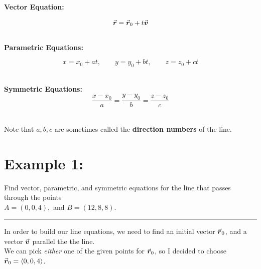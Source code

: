 \hspace*{.2in}





\textbf{Vector Equation:}

\[
\r = \r_0 + t \v
\]
~\\

\textbf{Parametric Equations:}

\[
x = x_0 + a t, \qquad y = y_0 + b t, \qquad z = z_0 + c t
\]

~\\

\textbf{Symmetric Equations:}\\

\[
\frac{x-x_0}{a} = \frac{ y - y_0}{b} = \frac{z - z_0}{c}
\]

~\\


Note that \(a, b, c\) are sometimes called the \textbf{direction numbers} of the line.



%

\section*{Example 1:}%

%
Find vector, parametric, and symmetric equations for the line that passes through the points\\ \(
A = (0,0,4),\) and \( B = (12, 8, 8).\)\\
\hrule

In order to build our line equations, we need to find an initial vector \(\r_0\), and a vector \(\v\) parallel the the line.\\
 We can pick \textit{either} one of the given points for \(\r_0\), so I decided to choose \(\r_0 = \<0, 0, 4\>\).

